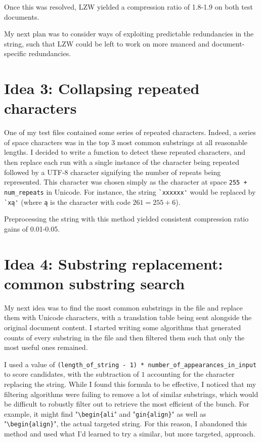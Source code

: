 \documentclass[11pt]{article} %
\begin{document}
Once this was resolved, LZW yielded a compression ratio of 1.8-1.9 on both test documents.

My next plan was to consider ways of exploiting predictable redundancies in the string, such that LZW could be left to work on more nuanced and document-specific redundancies.

\section{Idea 3: Collapsing repeated characters}

One of my test files contained some series of repeated characters. Indeed, a series of space characters was in the top 3 most common substrings at all reasonable lengths. I decided to write a function to detect these repeated characters, and then replace each run with a single instance of the character being repeated followed by a UTF-8 character signifying the number of repeats being represented. This character was chosen simply as the character at space \verb|255 + num_repeats| in Unicode. For instance, the string \verb|`xxxxxx'| would be replaced by \verb|`xą'| (where \verb|ą| is the character with code $261 = 255 + 6$).

Preprocessing the string with this method yielded consistent compression ratio gains of 0.01-0.05.


\section{Idea 4: Substring replacement: common substring search} \label{commonSubstringSearch}

My next idea was to find the most common substrings in the file and replace them with Unicode characters, with a translation table being sent alongside the original document content. I started writing some algorithms that generated counts of every substring in the file and then filtered them such that only the most useful ones remained.

I used a value of \verb|(length_of_string - 1) * number_of_appearances_in_input| to score candidates, with the subtraction of $1$ accounting for the character replacing the string. While I found this formula to be effective, I noticed that my filtering algorithms were failing to remove a lot of similar substrings, which would be difficult to robustly filter out to retrieve the most efficient of the bunch. For example, it might find "\verb|\begin{ali|" and "\verb|gin{align}|" as well as "\verb|\begin{align}|", the actual targeted string. For this reason, I abandoned this method and used what I'd learned to try a similar, but more targeted, approach.
\end{document}
